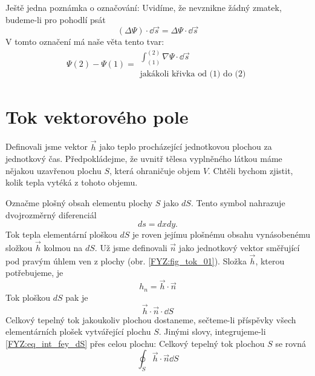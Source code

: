     Ještě jedna poznámka o označování: Uvidíme, že nevznikne žádný zmatek, budeme-li pro pohodlí psát
    \begin{equation}\label{fyz:eq_fey_curveint7}
     (\Delta\Psi)\cdot\dd{\vec{s}} = \Delta\Psi\cdot\dd{\vec{s}}
    \end{equation}     
    V tomto označení má naše věta tento tvar:
    \begin{equation}\label{fyz:eq_fey_curveint8}
     \Psi(2)-\Psi(1) = 
       \begin{array}{l}
         \displaystyle\int_{(1)}^{(2)}\nabla\Psi\cdot\dd{\vec{s}} \\
         \text{jakákoli křivka od (1) do (2)}
       \end{array}
    \end{equation}
    
  \section{Tok vektorového pole}
    Definovali jsme vektor $\vec{h}$ jako teplo procházející jednotkovou plochou za jednotkový čas.
    Předpokládejme, že uvnitř tělesa vyplněného látkou máme nějakou uzavřenou plochu \(S\), která 
    ohraničuje objem \(V\). Chtěli bychom zjistit, kolik tepla vytéká z tohoto objemu.
    
    Označme plošný obsah elementu plochy \(S\) jako \(dS\). Tento symbol nahrazuje dvojrozměrný
    diferenciál
    \begin{equation}
      ds=dxdy.
    \end{equation}
    Tok tepla elementární ploškou \(dS\) je roven jejímu plošnému obsahu  vynásobenému složkou 
    $\vec{h}$ kolmou na \(dS\). Už jsme definovali $\vec{n}$ jako jednotkový vektor směřující pod 
    pravým úhlem ven z plochy (obr. \ref{FYZ:fig_tok_01}). Složka $\vec{h}$, kterou potřebujeme, je
    \begin{equation}
      h_n = \vec{h}\cdot\vec{n}
    \end{equation}
    Tok ploškou $dS$ pak je
    \begin{equation}\label{FYZ:eq_int_fey_dS}
      \vec{h}\cdot\vec{n}\cdot\dd{S}
    \end{equation}
    Celkový tepelný tok jakoukoliv plochou dostaneme, sečteme-li příspěvky všech elementárních 
    plošek vytvářející plochu \(S\). Jinými slovy, integrujeme-li \ref{FYZ:eq_int_fey_dS} přes celou 
    plochu: Celkový tepelný tok plochou \(S\) se rovná
    \begin{equation}
      \oint_S\vec{h}\cdot\vec{n}\dd{S}
    \end{equation}
    
